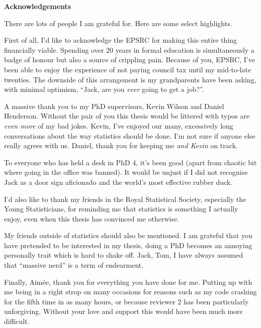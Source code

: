 
\thispagestyle{empty}
\clearpage


\begin{center}
  \textbf{Acknowledgements}\\[0.75cm]

  \begin{minipage}{0.9\textwidth}
    \setlength{\parskip}{0.45em}
There are lots of people I am grateful for. Here are some select highlights.

First of all, I'd like to acknowledge the EPSRC for making this entire thing financially viable. Spending over $20$ years in formal education is simultaneously a badge of honour but also a source of crippling pain. Because of you, EPSRC, I've been able to enjoy the experience of not paying council tax until my mid-to-late twenties. The downside of this arrangement is my grandparents have been asking, with minimal optimism, ``Jack, are you \emph{ever} going to get a job?''.

A massive thank you to my PhD supervisors, Kevin Wilson and Daniel Henderson. Without the pair of you this thesis would be littered with typos are \emph{even more} of my bad jokes. Kevin, I've enjoyed our many, excessively long conversations about the way statistics should be done. I'm not sure if anyone else really agrees with us. Daniel, thank you for keeping me \emph{and Kevin} on track.

To everyone who has held a desk in PhD 4, it's been good (apart from chaotic bit where going in the office was banned). It would be unjust if I did not recognise Jack as a door sign aficionado and the world's most effective rubber duck.

I'd also like to thank my friends in the Royal Statistical Society, especially the Young Statisticians, for reminding me that statistics is something I actually enjoy, even when this thesis has convinced me otherwise.

My friends outside of statistics should also be mentioned. I am grateful that you have pretended to be interested in my thesis, doing a PhD becomes an annoying personally trait which is hard to shake off. Jack, Tom, I have always assumed that ``massive nerd'' is a term of endearment.

Finally, Aim\'ee, thank you for everything you have done for me. Putting up with me being in a right strop on many occasions for reasons such as my code crashing for the fifth time in as many hours, or because reviewer 2 has been particularly unforgiving. Without your love and support this would have been much more difficult.

  \end{minipage}

\end{center}


\cleardoublepage
